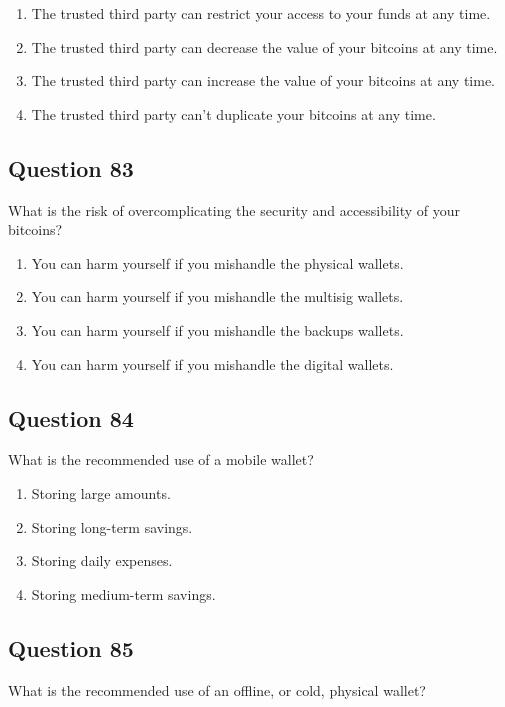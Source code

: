 \documentclass[12pt,a4paper]{article}
\begin{document}
\begin{enumerate}[label=\Alph*., leftmargin=*]
\item The trusted third party can restrict your access to your funds at any time.
\item The trusted third party can decrease the value of your bitcoins at any time.
\item The trusted third party can increase the value of your bitcoins at any time.
\item The trusted third party can't duplicate your bitcoins at any time.
\end{enumerate}

\bigskip


\subsection*{Question 83}
What is the risk of overcomplicating the security and accessibility of your bitcoins?

\begin{enumerate}[label=\Alph*., leftmargin=*]
\item You can harm yourself if you mishandle the physical wallets.
\item You can harm yourself if you mishandle the multisig wallets.
\item You can harm yourself if you mishandle the backups wallets.
\item You can harm yourself if you mishandle the digital wallets.
\end{enumerate}

\bigskip


\subsection*{Question 84}
What is the recommended use of a mobile wallet?

\begin{enumerate}[label=\Alph*., leftmargin=*]
\item Storing large amounts.
\item Storing long-term savings.
\item Storing daily expenses.
\item Storing medium-term savings.
\end{enumerate}

\bigskip


\subsection*{Question 85}
What is the recommended use of an offline, or cold, physical wallet?
\end{document}
